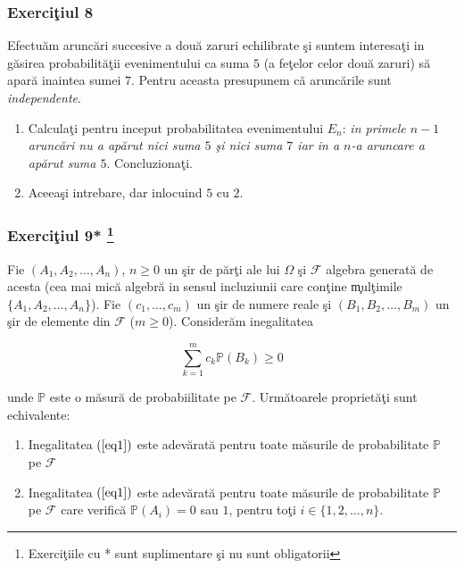 \documentclass[]{article}
\let\rmarkdownfootnote\footnote%
\def\footnote{\protect\rmarkdownfootnote}
\def\Om{\Omega}
\def\PP{{\mathbb P}}
\def\MF{{\mathcal F}}
\begin{document}
\subsubsection{\texorpdfstring{Exerci\c tiul
8}{Exerciiul 8}}\label{exerciiul-8}

Efectu\u am arunc\u ari succesive a dou\u a zaruri echilibrate \c si
suntem interesa\c ti in g\u asirea probabilit\u a\c tii evenimentului ca
suma \(5\) (a fe\c telor celor dou\u a zaruri) s\u a apar\u a inaintea
sumei \(7\). Pentru aceasta presupunem c\u a arunc\u arile sunt
\emph{independente}.

\begin{enumerate}
\def\labelenumi{\arabic{enumi}.}
\item
  Calcula\c ti pentru inceput probabilitatea evenimentului \(E_n\):
  \emph{in primele \(n-1\) arunc\u ari nu a ap\u arut nici suma \(5\)
  \c si nici suma \(7\) iar in a \(n\)-a aruncare a ap\u arut suma
  \(5\)}. Concluziona\c ti.
\item
  Aceea\c si intrebare, dar inlocuind \(5\) cu \(2\).
\end{enumerate}

\subsubsection[Exerci\c tiul 9* ]{\texorpdfstring{Exerci\c tiul 9*
\footnote{Exerci\c tiile cu * sunt suplimentare \c si nu sunt
  obligatorii}}{Exerciiul 9* }}\label{exerciiul-9}

Fie \((A_1, A_2, \dots, A_n)\), \(n\geq0\) un \c sir de p\u ar\c ti ale
lui \(\Om\) \c si \(\MF\) algebra generat\u a de acesta (cea mai mic\u a
algebr\u a in sensul incluziunii care con\c tine \c mul\c timile
\(\{A_1, A_2, \dots, A_n\}\)). Fie \((c_1, \dots,c_m)\) un \c sir de
numere reale \c si \((B_1, B_2, \dots, B_m)\) un \c sir de elemente din
\(\MF\) (\(m\geq 0\)). Consider\u am inegalitatea

\begin{equation}\label{eq1}
  \displaystyle\sum_{k=1}^{m}c_k\PP(B_k)\geq 0
\end{equation}

unde \(\PP\) este o m\u asur\u a de probabiilitate pe \(\MF\).
Urm\u atoarele propriet\u a\c ti sunt echivalente:

\begin{enumerate}
\def\labelenumi{\alph{enumi})}
\item
  Inegalitatea \((\ref{eq1})\) este adev\u arat\u a pentru toate
  m\u asurile de probabilitate \(\PP\) pe \(\MF\)
\item
  Inegalitatea \((\ref{eq1})\) este adev\u arat\u a pentru toate
  m\u asurile de probabilitate \(\PP\) pe \(\MF\) care verific\u a
  \(\PP(A_i)=0\) sau \(1\), pentru to\c ti \(i\in\{1,2,\dots,n\}\).
\end{enumerate}
\end{document}
